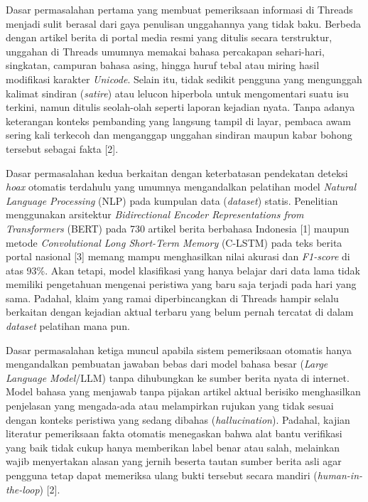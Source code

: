 \documentclass[12pt,a4paper,twoside]{report}
\begin{document}
Dasar permasalahan pertama yang membuat pemeriksaan informasi di Threads menjadi sulit berasal dari gaya penulisan unggahannya yang tidak baku. Berbeda dengan artikel berita di portal media resmi yang ditulis secara terstruktur, unggahan di Threads umumnya memakai bahasa percakapan sehari-hari, singkatan, campuran bahasa asing, hingga huruf tebal atau miring hasil modifikasi karakter \textit{Unicode}. Selain itu, tidak sedikit pengguna yang mengunggah kalimat sindiran (\textit{satire}) atau lelucon hiperbola untuk mengomentari suatu isu terkini, namun ditulis seolah-olah seperti laporan kejadian nyata. Tanpa adanya keterangan konteks pembanding yang langsung tampil di layar, pembaca awam sering kali terkecoh dan menganggap unggahan sindiran maupun kabar bohong tersebut sebagai fakta [2].

Dasar permasalahan kedua berkaitan dengan keterbatasan pendekatan deteksi \textit{hoax} otomatis terdahulu yang umumnya mengandalkan pelatihan model \textit{Natural Language Processing} (NLP) pada kumpulan data (\textit{dataset}) statis. Penelitian menggunakan arsitektur \textit{Bidirectional Encoder Representations from Transformers} (BERT) pada 730 artikel berita berbahasa Indonesia [1] maupun metode \textit{Convolutional Long Short-Term Memory} (C-LSTM) pada teks berita portal nasional [3] memang mampu menghasilkan nilai akurasi dan \textit{F1-score} di atas 93\%. Akan tetapi, model klasifikasi yang hanya belajar dari data lama tidak memiliki pengetahuan mengenai peristiwa yang baru saja terjadi pada hari yang sama. Padahal, klaim yang ramai diperbincangkan di Threads hampir selalu berkaitan dengan kejadian aktual terbaru yang belum pernah tercatat di dalam \textit{dataset} pelatihan mana pun.

Dasar permasalahan ketiga muncul apabila sistem pemeriksaan otomatis hanya mengandalkan pembuatan jawaban bebas dari model bahasa besar (\textit{Large Language Model}/LLM) tanpa dihubungkan ke sumber berita nyata di internet. Model bahasa yang menjawab tanpa pijakan artikel aktual berisiko menghasilkan penjelasan yang mengada-ada atau melampirkan rujukan yang tidak sesuai dengan konteks peristiwa yang sedang dibahas (\textit{hallucination}). Padahal, kajian literatur pemeriksaan fakta otomatis menegaskan bahwa alat bantu verifikasi yang baik tidak cukup hanya memberikan label benar atau salah, melainkan wajib menyertakan alasan yang jernih beserta tautan sumber berita asli agar pengguna tetap dapat memeriksa ulang bukti tersebut secara mandiri (\textit{human-in-the-loop}) [2].
\end{document}
